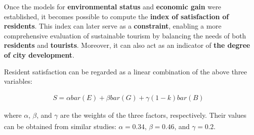 \documentclass[UTF8]{mcmthesis}
\begin{document}
        \hspace*{2em} Once the models for \textbf{environmental status} and \textbf{economic gain} were established, it becomes possible to compute the \textbf{index of satisfaction of residents}. This index can later serve as a \textbf{constraint}, enabling a more comprehensive evaluation of sustainable tourism by balancing the needs of both \textbf{residents} and \textbf{tourists}. Moreover, it can also act as an indicator of \textbf{the degree of city development}.
        



    Resident satisfaction can be regarded as a linear combination of the above three variables:

    \begin{equation}
        \begin{aligned}
S = \alpha bar(E)+\beta bar(G) +\gamma(1-k)bar(B)
        \end{aligned}
        \end{equation}

        where $\alpha$, $\beta$, and $\gamma$ are the weights of the three factors, respectively. Their values can be obtained from similar studies\textsuperscript{\cite{Cottrell}}: $\alpha = 0.34$, $\beta = 0.46$, and $\gamma = 0.2$.
\end{document}
